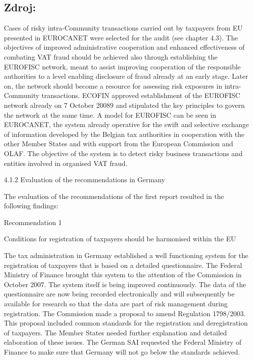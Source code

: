 \documentclass[10pt]{article}
\begin{document}
\subsection*{Zdroj:}

Cases of risky intra-Community transactions carried out by taxpayers from EU presented in EUROCANET were selected for the audit (see chapter 4.3).
The objectives of improved administrative cooperation and enhanced effectiveness of combating VAT fraud should be achieved also through establishing the EUROFISC network, meant to assist improving cooperation of the responsible authorities to a level enabling disclosure of fraud already at an early stage.
Later on, the network should become a resource for assessing risk exposures in intra-Community transactions.
ECOFIN approved establishment of the EUROFISC network already on 7 October 20089 and stipulated the key principles to govern the network at the same time.
A model for EUROFISC can be seen in EUROCANET, the system already operative for the swift and selective exchange of information developed by the Belgian tax authorities in cooperation with the other Member States and with support from the European Commission and OLAF.
The objective of the system is to detect risky business transactions and entities involved in organised VAT fraud.


4.1.2 Evaluation of the recommendations in Germany



The evaluation of the recommendations of the first report resulted in the following findings:



Recommendation 1



Conditions for registration of taxpayers should be harmonised within the EU

The tax administration in Germany established a well functioning system for the registration of taxpayers that is based on a detailed questionnaire.
The Federal Ministry of Finance brought this system to the attention of the Commission in October 2007.
The system itself is being improved continuously.
The data of the questionnaire are now being recorded electronically and will subsequently be available for research so that the data are part of risk management during registration.
The Commission made a proposal to amend Regulation 1798/2003. This proposal included common standards for the registration and deregistration of taxpayers.
The Member States needed further explanation and detailed elaboration of these issues.
The German SAI requested the Federal Ministry of Finance to make sure that Germany will not go below the standards achieved.
\end{document}

